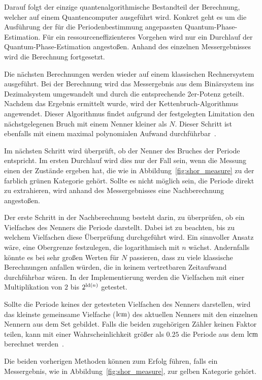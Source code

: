 Darauf folgt der einzige quantenalgorithmische Bestandteil der Berechnung, 
welcher auf einem Quantencomputer ausgeführt wird.
Konkret geht es um die Ausführung der für die Periodenbestimmung angepassten Quantum-Phase-Estimation. 
Für ein ressourceneffizienteres Vorgehen wird nur ein Durchlauf der Quantum-Phase-Estimation angestoßen.
Anhand des einzelnen Messergebnisses wird die Berechnung fortgesetzt.

Die nächsten Berechnungen werden wieder auf einem klassischen Rechnersystem ausgeführt.
Bei der Berechnung wird das Messergebnis aus dem Binärsystem ins Dezimalsystem umgewandelt
und durch die entsprechende 2er-Potenz geteilt.
Nachdem das Ergebnis ermittelt wurde, 
wird der Kettenbruch-Algorithmus angewendet. 
Dieser Algorithmus findet aufgrund der festgelegten Limitation den nächstgelegenen Bruch mit einem Nenner kleiner als \(N\).
Dieser Schritt ist ebenfalls mit einem maximal polynomialen Aufwand durchführbar~\autocite[230]{nielsen_chuang_2010}.

Im nächsten Schritt wird überprüft, ob der Nenner des Bruches der Periode entspricht.
Im ersten Durchlauf wird dies nur der Fall sein, 
wenn die Messung einen der Zustände ergeben hat, 
die wie in Abbildung~\ref{fig:shor_measure} zu der farblich grünen Kategorie gehört.
Sollte es nicht möglich sein, die Periode direkt zu extrahieren, 
wird anhand des Messergebnisses eine Nachberechnung angestoßen.

Der erste Schritt in der Nachberechnung besteht darin, 
zu überprüfen, ob ein Vielfaches des Nenners die Periode darstellt.
Dabei ist zu beachten, bis zu welchem Vielfachen diese Überprüfung durchgeführt wird. 
Ein sinnvoller Ansatz wäre, eine Obergrenze festzulegen, die logarithmisch mit \(n\) wächst.
Andernfalls könnte es bei sehr großen Werten für \(N\) passieren, 
dass zu viele klassische Berechnungen anfallen würden, die in keinem vertretbaren Zeitaufwand durchführbar wären.
In der Implementierung werden die Vielfachen mit einer Multiplikation von \(2\) bis \(2^{\operatorname{ld}(n)}\) getestet.

Sollte die Periode keines der getesteten Vielfachen des Nenners darstellen, 
wird das kleinste gemeinsame Vielfache (\(\operatorname{lcm}\)) des aktuellen Nenners mit den einzelnen Nennern aus dem Set gebildet.
Falls die beiden zugehörigen Zähler keinen Faktor teilen, 
kann mit einer Wahrscheinlichkeit größer als \(0.25\) die Periode aus dem \(\operatorname{lcm}\) berechnet werden~\cite[231]{nielsen_chuang_2010}.

Die beiden vorherigen Methoden können zum Erfolg führen, 
falls ein Messergebnis, wie in Abbildung~\ref{fig:shor_measure}, 
zur gelben Kategorie gehört. 


